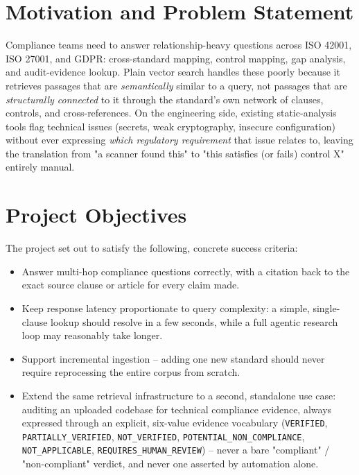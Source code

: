 \documentclass[12pt,a4paper]{report}
\begin{document}
\section{Motivation and Problem Statement}

Compliance teams need to answer relationship-heavy questions across ISO
42001, ISO 27001, and \ac{GDPR}: cross-standard mapping, control mapping,
gap analysis, and audit-evidence lookup. Plain vector search handles these
poorly because it retrieves passages that are \emph{semantically} similar to
a query, not passages that are \emph{structurally connected} to it through
the standard's own network of clauses, controls, and cross-references. On
the engineering side, existing static-analysis tools flag technical issues
(secrets, weak cryptography, insecure configuration) without ever expressing
\emph{which regulatory requirement} that issue relates to, leaving the
translation from "a scanner found this" to "this satisfies (or fails)
control X" entirely manual.

\section{Project Objectives}

The project set out to satisfy the following, concrete success criteria:

\begin{itemize}
  \item Answer multi-hop compliance questions correctly, with a citation
        back to the exact source clause or article for every claim made.
  \item Keep response latency proportionate to query complexity: a simple,
        single-clause lookup should resolve in a few seconds, while a full
        agentic research loop may reasonably take longer.
  \item Support incremental ingestion -- adding one new standard should
        never require reprocessing the entire corpus from scratch.
  \item Extend the same retrieval infrastructure to a second, standalone
        use case: auditing an uploaded codebase for technical compliance
        evidence, always expressed through an explicit, six-value evidence
        vocabulary (\texttt{VERIFIED}, \texttt{PARTIALLY\_VERIFIED},
        \texttt{NOT\_VERIFIED}, \texttt{POTENTIAL\_NON\_COMPLIANCE},
        \texttt{NOT\_APPLICABLE}, \texttt{REQUIRES\_HUMAN\_REVIEW}) --
        never a bare "compliant" / "non-compliant" verdict, and never one
        asserted by automation alone.
\end{itemize}
\end{document}
